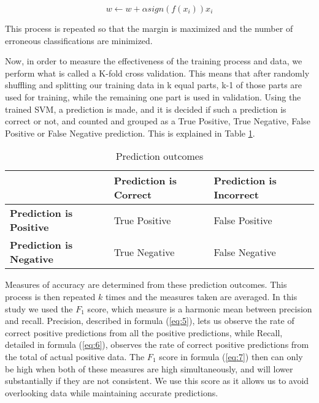 \documentclass[review]{elsarticle}
\begin{document}
\begin{equation}\label{eq:4}
w \leftarrow w + \alpha  sign(f(x_{i}))x_{i}
\end{equation}

This process is repeated so that the margin is maximized and the number of erroneous classifications are minimized. 

Now, in order to measure the effectiveness of the training process and data, we perform what is called a K-fold cross validation. This means that after randomly shuffling and splitting our training data in k equal parts, k-1 of those parts are used for training, while the remaining one part is used in validation. Using the trained SVM, a prediction is made, and it is decided if such a prediction is correct or not, and counted and grouped as a True Positive, True Negative, False Positive or False Negative prediction. This is explained in Table \ref{tab:preds}.

\begin{table} \centering
\caption{Prediction outcomes}\label{tab:preds}
\begin{tabular}{|>{\centering\arraybackslash}m{7em}|>{\centering\arraybackslash}m{7em}|>{\centering\arraybackslash}m{7em}|} \arrayrulecolor{white}\hline %
\multicolumn{1}{c|}{} & \cellcolor{Mustard}\textbf{Prediction is Correct} & \cellcolor{LightPlum}\textbf{Prediction is Incorrect} \\ \hline
\cellcolor{DarkBlue}\textbf{Prediction is Positive} & \cellcolor{DeepGreen}True Positive & \cellcolor{DeepPurple}False Positive \\ \hline
\cellcolor{DeepSalmon}\textbf{Prediction is Negative} & \cellcolor{orange}True Negative & \cellcolor{Plum}False Negative \\ \hline
\end{tabular}
\end{table}

Measures of accuracy are determined from these prediction outcomes. This process is then repeated \(k\) times and the measures taken are averaged. In this study we used the \(F_{1}\) score, which measure is a harmonic mean between precision and recall. Precision, described in formula (\ref{eq:5}), lets us observe the rate of correct positive predictions from all the positive predictions, while Recall, detailed in formula (\ref{eq:6}), observes the rate of correct positive predictions from the total of actual positive data. The \(F_{1}\) score in formula (\ref{eq:7}) then can only be high when both of these measures are high simultaneously, and will lower substantially if they are not consistent. We use this score as it allows us to avoid overlooking data while maintaining accurate predictions.
\end{document}
